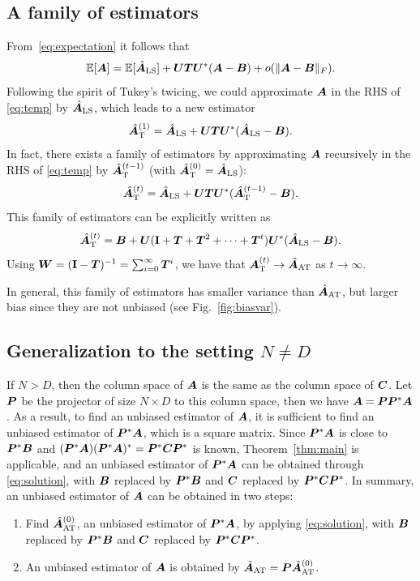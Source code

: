 \subsection{A family of estimators}
\label{sec:fam_estimators}
From~\eqref{eq:expectation} it follows that
 \begin{equation}\label{eq:temp}
\operatorname{\mathbb{E}}[\boldsymbol{A}]=\operatorname{\mathbb{E}}[\hat{\boldsymbol{A}}_{{\text{LS}}}]+\boldsymbol{U}\boldsymbol{T}\boldsymbol{U}^*(\boldsymbol{A}-\boldsymbol{B}) + 
o(\|\boldsymbol{A}-\boldsymbol{B}\|_F).
\end{equation}
Following the spirit of Tukey's twicing, we could approximate $\boldsymbol{A}$ in the RHS of 
\eqref{eq:temp} by $\hat{\boldsymbol{A}}_{\text{LS}}$, which leads to a new estimator
\[
\hat{\boldsymbol{A}}_{\text{T}}^{(1)}=\hat{\boldsymbol{A}}_{\text{LS}}+\boldsymbol{U}\boldsymbol{T}\boldsymbol{U}^*(\hat{\boldsymbol{A}}_{\text{LS}}
-\boldsymbol{B}).
\]
In fact, there exists a family of estimators by approximating $\boldsymbol{A}$ recursively in the RHS 
of \eqref{eq:temp} by $\hat{\boldsymbol{A}}_{\text{T}}^{(t-1)}$ (with $\hat{\boldsymbol{A}}_{\text{T}}^{(0)} = \hat{\boldsymbol{A}}_{\text{LS}}$):
\begin{equation}
\hat{\boldsymbol{A}}_{\text{T}}^{(t)}=\hat{\boldsymbol{A}}_{\text{LS}}+\boldsymbol{U}\boldsymbol{T}\boldsymbol{U}^*(\hat{\boldsymbol{A}}_{\text{T}}^{(t-1)}
-\boldsymbol{B}).
\end{equation}
This family of estimators can be explicitly written as
\begin{equation}
\label{eqn:family_est}
\hat{\boldsymbol{A}}_{\text{T}}^{(t)}=\boldsymbol{B}+\boldsymbol{U}(\mathbf{I}+\boldsymbol{T}+\boldsymbol{T}^2+\cdots+\boldsymbol{T}^t)\boldsymbol{U}^*(\hat{\boldsymbol{A}}_{\text{LS}}-\boldsymbol{B}).
\end{equation}
Using $\boldsymbol{W}=(\mathbf{I}-\boldsymbol{T})^{-1}=\sum_{i=0}^\infty\boldsymbol{T}^i$, we have that $\boldsymbol{A}_{\text{T}}^{(t)}\rightarrow 
\hat{\boldsymbol{A}}_{\text{AT}}$ as $t\rightarrow\infty$.

In general, this family of estimators has smaller variance than 
$\hat{\boldsymbol{A}}_{\text{AT}}$, but larger bias since they are not unbiased (see Fig.~\ref{fig:biasvar}).


\subsection{Generalization to the setting $N\neq D$}


If $N > D$, then the column space of $\boldsymbol{A}$ is the same as the column space of 
$\boldsymbol{C}$. Let $\boldsymbol{P}$ be the projector of size $N\times D$ to this column space, 
then we have $\boldsymbol{A}=\boldsymbol{P}\boldsymbol{P}^*\boldsymbol{A}$. As a result, to find an unbiased estimator of 
$\boldsymbol{A}$, it is sufficient to find an unbiased estimator of $\boldsymbol{P}^*\boldsymbol{A}$, which is a 
square matrix. Since $\boldsymbol{P}^*\boldsymbol{A}$ is close to $\boldsymbol{P}^*\boldsymbol{B}$ and 
$(\boldsymbol{P}^*\boldsymbol{A})(\boldsymbol{P}^*\boldsymbol{A})^*=\boldsymbol{P}^*\boldsymbol{C}\boldsymbol{P}^*$ is known, Theorem~\ref{thm:main} is 
applicable, and an unbiased estimator of $\boldsymbol{P}^*\boldsymbol{A}$ can be obtained through 
\eqref{eq:solution}, with $\boldsymbol{B}$ replaced by $\boldsymbol{P}^*\boldsymbol{B}$ and $\boldsymbol{C}$ replaced by 
$\boldsymbol{P}^*\boldsymbol{C}\boldsymbol{P}^*$. In summary, an unbiased estimator of $\boldsymbol{A}$ can be obtained in 
two steps:
\begin{enumerate}
\item Find $\hat{\boldsymbol{A}}^{(0)}_{\text{AT}}$, an unbiased estimator of $\boldsymbol{P}^*\boldsymbol{A}$, 
by applying \eqref{eq:solution}, with $\boldsymbol{B}$ replaced by $\boldsymbol{P}^*\boldsymbol{B}$ and $\boldsymbol{C}$ 
replaced by $\boldsymbol{P}^*\boldsymbol{C}\boldsymbol{P}^*$.
\item An unbiased estimator of $\boldsymbol{A}$ is obtained by 
$\hat{\boldsymbol{A}}_{\text{AT}}=\boldsymbol{P}\hat{\boldsymbol{A}}^{(0)}_{\text{AT}}$.
\end{enumerate}


